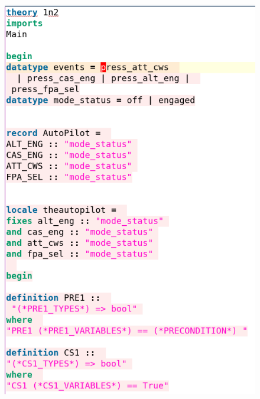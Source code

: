\begin{figure}[H]
     \centering
     \begin{minipage}{0.45\textwidth}
     \centering
     \includegraphics[width=\linewidth]{Figures/fullexample/sfisabellefill1.png}
     \end{minipage}\hfill
     \begin{minipage}{0.45\textwidth}
     \centering

\end{minipage}
\end{figure}
